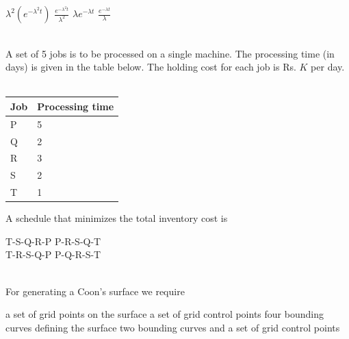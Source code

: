 \documentclass[addpoints,11pt]{exam}
\begin{document}
\begin{questions}
    \begin{oneparchoices}
        \choice $\lambda^2(e^{-\lambda^2t})$
        \choice $\frac{e^{-\lambda^2t}}{\lambda^2}$
        \choice $\lambda e^{-\lambda t}$
        \choice $\frac{e^{-\lambda t}}{\lambda}$
    \end{oneparchoices}\\

    \question A set of 5 jobs is to be processed on a single machine. The processing time (in days) is given in the table below. The holding cost for each job is Rs. $K$ per day.\\\\
    \begin{center}
        \begin{tabular}{|l|l|}
            \hline
            \textbf{Job} & \textbf{Processing time} \\
            \hline
            P            & 5                        \\\hline
            Q            & 2                        \\\hline
            R            & 3                        \\\hline
            S            & 2                        \\\hline
            T            & 1                        \\\hline
        \end{tabular}
    \end{center}
    A schedule that minimizes the total inventory cost is
    
    \begin{oneparchoices}
        \choice T-S-Q-R-P
        \choice P-R-S-Q-T\\
        \choice T-R-S-Q-P
        \choice P-Q-R-S-T
    \end{oneparchoices}\\

    \question For generating a Coon's surface we require\\
    \begin{choices}
        \choice a set of grid points on the surface
        \choice a set of grid control points
        \choice four bounding curves defining the surface
        \choice two bounding curves and a set of grid control points
    \end{choices}


\end{questions}
\end{document}
